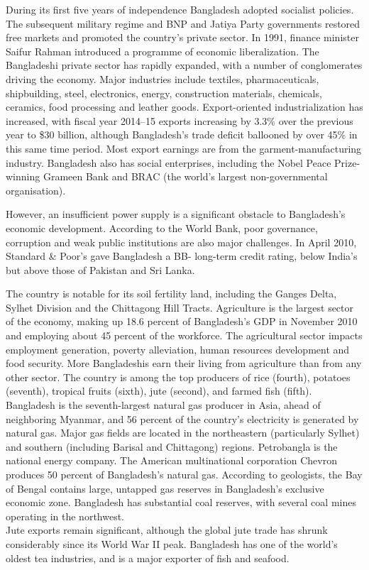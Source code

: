 During its first five years of independence Bangladesh adopted socialist
policies. The subsequent military regime and BNP and Jatiya Party
governments restored free markets and promoted the country's private
sector. In 1991, finance minister Saifur Rahman introduced a programme
of economic liberalization. The Bangladeshi private sector has rapidly
expanded, with a number of conglomerates driving the economy. Major
industries include textiles, pharmaceuticals, shipbuilding, steel,
electronics, energy, construction materials, chemicals, ceramics, food
processing and leather goods. Export-oriented industrialization has
increased, with fiscal year 2014--15 exports increasing by 3.3\% over
the previous year to \$30 billion, although Bangladesh's trade deficit
ballooned by over 45\% in this same time period. Most export earnings
are from the garment-manufacturing industry. Bangladesh also has social
enterprises, including the Nobel Peace Prize-winning Grameen Bank and
BRAC (the world's largest non-governmental organisation).

However, an insufficient power supply is a significant obstacle to
Bangladesh's economic development. According to the World Bank, poor
governance, corruption and weak public institutions are also major
challenges. In April 2010, Standard \& Poor's gave Bangladesh a BB-
long-term credit rating, below India's but above those of Pakistan and
Sri Lanka.

The country is notable for its soil fertility land, including the Ganges
Delta, Sylhet Division and the Chittagong Hill Tracts. Agriculture is
the largest sector of the economy, making up 18.6 percent of
Bangladesh's GDP in November 2010 and employing about 45 percent of the
workforce. The agricultural sector impacts employment generation,
poverty alleviation, human resources development and food security. More
Bangladeshis earn their living from agriculture than from any other
sector. The country is among the top producers of rice (fourth),
potatoes (seventh), tropical fruits (sixth), jute (second), and farmed
fish (fifth).\\
Bangladesh is the seventh-largest natural gas producer in Asia, ahead of
neighboring Myanmar, and 56 percent of the country's electricity is
generated by natural gas. Major gas fields are located in the
northeastern (particularly Sylhet) and southern (including Barisal and
Chittagong) regions. Petrobangla is the national energy company. The
American multinational corporation Chevron produces 50 percent of
Bangladesh's natural gas. According to geologists, the Bay of Bengal
contains large, untapped gas reserves in Bangladesh's exclusive economic
zone. Bangladesh has substantial coal reserves, with several coal mines
operating in the northwest.\\
Jute exports remain significant, although the global jute trade has
shrunk considerably since its World War II peak. Bangladesh has one of
the world's oldest tea industries, and is a major exporter of fish and
seafood.

